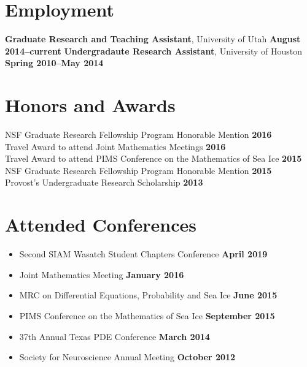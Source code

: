 \documentclass[margin,line]{res}
\begin{document}
\begin{resume}
\section{\sc Employment}
{\bf Graduate Research and Teaching Assistant}, University of Utah \hfill {\bf August 2014--current}
{\bf Undergradaute Research Assistant}, University of Houston \hfill {\bf Spring 2010--May 2014}

\section{\sc Honors and Awards}
{NSF Graduate Research Fellowship Program Honorable Mention} \hfill {\bf 2016}\\
{Travel Award to attend Joint Mathematics Meetings} \hfill {\bf 2016}\\
{Travel Award to attend PIMS Conference on the Mathematics of Sea Ice} \hfill {\bf 2015}\\
{NSF Graduate Research Fellowship Program Honorable Mention} \hfill {\bf 2015}\\
{Provost's Undergraduate Research Scholarship} \hfill {\bf 2013}\\
\ifx\nopubs\undefined

\else
\fi

\section{\sc Attended Conferences}
\begin{itemize}
\item[] Second SIAM Wasatch Student Chapters Conference
\hfill {\bf April 2019}
\item[] Joint Mathematics Meeting
\hfill {\bf January 2016}
\item[] MRC on Differential Equations, Probability and Sea Ice
\hfill {\bf June 2015}
\item[] PIMS Conference on the Mathematics of Sea Ice
\hfill {\bf September 2015}
\item[] 37th Annual Texas PDE Conference
\hfill {\bf March 2014}
\item[] Society for Neuroscience Annual Meeting
\hfill {\bf October 2012}
\end{itemize}


\end{resume}
\end{document}
